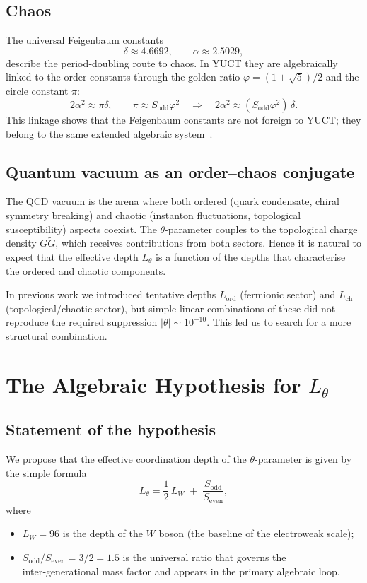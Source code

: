 \documentclass[12pt,a4paper]{article}
\begin{document}
	\subsection{Chaos}
	The universal Feigenbaum constants
	\[
	\delta \approx 4.6692,\qquad \alpha \approx 2.5029,
	\]
	describe the period‑doubling route to chaos. In YUCT they are algebraically linked to the order constants through the golden ratio \(\varphi = (1+\sqrt{5})/2\) and the circle constant \(\pi\):
	\[
	2\alpha^2 \approx \pi\delta,\qquad
	\pi \approx S_{\mathrm{odd}}\varphi^2 \quad \Longrightarrow \quad 
	2\alpha^2 \approx (S_{\mathrm{odd}}\varphi^2)\,\delta .
	\]
	This linkage shows that the Feigenbaum constants are not foreign to YUCT; they belong to the same extended algebraic system~\cite{Y2}.
	
	\subsection{Quantum vacuum as an order–chaos conjugate}
	The QCD vacuum is the arena where both ordered (quark condensate, chiral symmetry breaking) and chaotic (instanton fluctuations, topological susceptibility) aspects coexist. The \(\theta\)-parameter couples to the topological charge density \(G\widetilde{G}\), which receives contributions from both sectors. Hence it is natural to expect that the effective depth \(L_\theta\) is a function of the depths that characterise the ordered and chaotic components.
	
	In previous work we introduced tentative depths \(L_{\mathrm{ord}}\) (fermionic sector) and \(L_{\mathrm{ch}}\) (topological/chaotic sector), but simple linear combinations of these did not reproduce the required suppression \(|\theta| \sim 10^{-10}\). This led us to search for a more structural combination.
	
	\section{The Algebraic Hypothesis for \(L_\theta\)}
	\label{sec:hypothesis}
	
	\subsection{Statement of the hypothesis}
	
	We propose that the effective coordination depth of the \(\theta\)-parameter is given by the simple formula
	\begin{equation}
		\boxed{L_\theta = \frac{1}{2}\,L_W \;+\; \frac{S_{\mathrm{odd}}}{S_{\mathrm{even}}}},
		\label{eq:Ltheta}
	\end{equation}
	where
	\begin{itemize}
		\item \(L_W = 96\) is the depth of the \(W\) boson (the baseline of the electroweak scale);
		\item \(S_{\mathrm{odd}}/S_{\mathrm{even}} = 3/2 = 1.5\) is the universal ratio that governs the inter‑generational mass factor and appears in the primary algebraic loop.
	\end{itemize}
	
\end{document}
